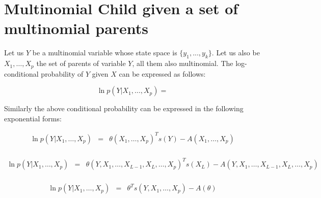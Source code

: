 \documentclass[11pt, oneside]{article}   	%
\numberwithin{figure}{section}
\numberwithin{equation}{section}
\numberwithin{table}{section}
\begin{document}
\section{Multinomial Child given a set of multinomial parents}

Let us $Y$ be a multinomial variable whose state space is $\{y_1,...,y_k\}$. Let us also be $X_1,\ldots,X_p$ the set of parents of variable $Y$, all them also multinomial. The log-conditional probability of $Y$ given $X$ can be expressed as follows:

$$ \ln p(Y|X_1,\ldots,X_p) = $$


Similarly the above conditional probability can be expressed in the following exponential forms:

\begin{eqnarray*}
\ln p(Y|X_1,\ldots ,X_p) &=& \theta(X_1,\ldots ,X_p)^Ts(Y) - A(X_1,\ldots ,X_p) \\
\end{eqnarray*}

\begin{eqnarray*}
\ln p(Y|X_1,\ldots ,X_p) &=& \theta(Y, X_1,\ldots ,X_{L-1},X_L, \ldots ,X_p)^T s(X_L) - A(Y, X_1,\ldots ,X_{L-1},X_L, \ldots ,X_p) \\
\end{eqnarray*}


\begin{eqnarray*}
\ln p(Y|X_1,\ldots ,X_p) &=& \theta^Ts(Y,X_1,\ldots ,X_p) - A(\theta) \\
\end{eqnarray*}

%
%
\end{document}

